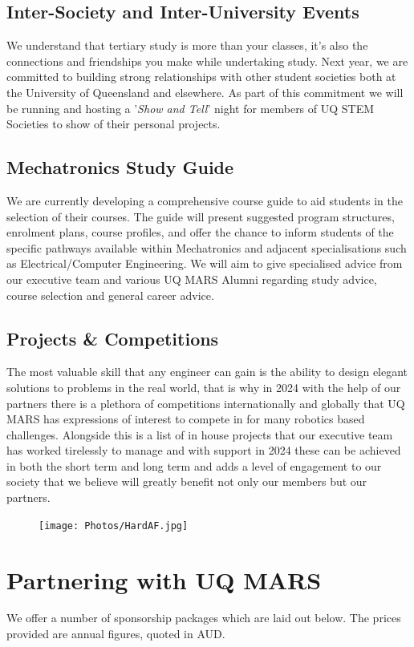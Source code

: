 \documentclass[a4paper,12pt]{report}
\begin{document}
\subsection*{Inter-Society and Inter-University Events}
We understand that tertiary study is more than your classes, it's also the connections and friendships you make while undertaking study.
Next year, we are committed to building strong relationships with other student societies both at the University of Queensland and elsewhere.
As part of this commitment we will be running and hosting a '\textit{Show and Tell}' night for members of UQ STEM Societies to show of their personal projects.

\subsection*{Mechatronics Study Guide}
We are currently developing a comprehensive course guide to aid students in the selection of their courses.
The guide will present suggested program structures, enrolment plans, course profiles, and offer the chance to inform students of the specific pathways available within Mechatronics and adjacent specialisations such as Electrical/Computer Engineering.
We will aim to give specialised advice from our executive team and various UQ MARS Alumni regarding study advice, course selection and general career advice.

\subsection*{Projects \& Competitions}
The most valuable skill that any engineer can gain is the ability to design elegant solutions to problems in the real world, that is why in 2024 with the help of our partners there is a plethora of competitions internationally and globally that UQ MARS has expressions of interest to compete in for many robotics based challenges. Alongside this is a list of in house projects that our executive team has worked tirelessly to manage and with support in 2024 these can be achieved in both the short term and long term and adds a level of engagement to our society that we believe will greatly benefit not only our members but our partners.

\begin{figure}[H]
    \centering
    \texttt{[image: Photos/HardAF.jpg]}
\end{figure}

\newpage

\section*{Partnering with UQ MARS}
\large
We offer a number of sponsorship packages which are laid out below. The prices provided are annual figures, quoted in AUD.
\normalsize
\end{document}
